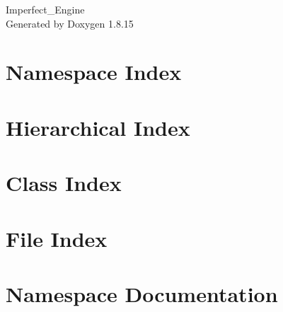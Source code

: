 \let\mypdfximage\pdfximage\def\pdfximage{\immediate\mypdfximage}\documentclass[twoside]{book}
\newcommand{\+}{\discretionary{\mbox{\scriptsize$\hookleftarrow$}}{}{}}
\newcommand{\clearemptydoublepage}{%
  \newpage{\pagestyle{empty}\cleardoublepage}%
}
\begin{document}
\begin{titlepage}
\vspace*{7cm}
\begin{center}%
{\Large Imperfect\+\_\+\+Engine }\\
\vspace*{1cm}
{\large Generated by Doxygen 1.8.15}\\
\end{center}
\end{titlepage}
\clearemptydoublepage
{}
\tableofcontents
\clearemptydoublepage
{}

\chapter{Namespace Index}

\chapter{Hierarchical Index}

\chapter{Class Index}

\chapter{File Index}

\chapter{Namespace Documentation}


\end{document}
